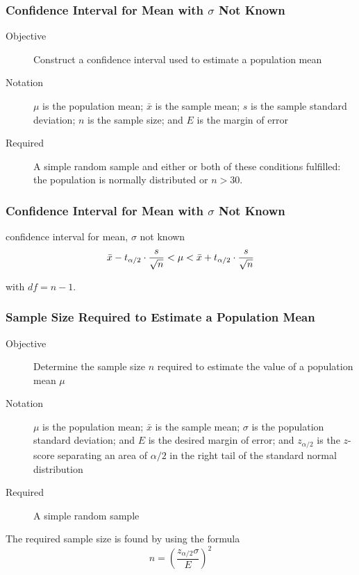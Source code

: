 \documentclass[xcolor=dvipsnames]{beamer}
\begin{document}
\begin{frame}
  \frametitle{Confidence Interval for Mean with $\sigma$
    Not Known}
  \begin{description}
  \item[Objective] Construct a confidence interval used to estimate a
    population mean
  \item[Notation] $\mu$ is the population mean; $\bar{x}$ is the
    sample mean; $s$ is the sample standard deviation; $n$ is the sample size; and $E$ is the margin of
    error
  \item[Required] A simple random sample and either or both of these
    conditions fulfilled: the population is normally distributed or
    $n>30$.
  \end{description}
\end{frame}


\begin{frame}
  \frametitle{Confidence Interval for Mean with $\sigma$
    Not Known}
  \begin{block}{confidence interval for mean, $\sigma$ not known}
    \begin{equation}
      \label{eq:wefahjoh}
      \bar{x}-t_{\alpha/2}\cdot\frac{s}{\sqrt{n}}<\mu<\bar{x}+t_{\alpha/2}\cdot\frac{s}{\sqrt{n}}\notag
    \end{equation}
  \end{block}
with $df=n-1$.
\end{frame}

\begin{frame}
  \frametitle{Sample Size Required to Estimate a Population Mean}
  \begin{description}
  \item[Objective] Determine the sample size $n$ required to estimate
    the value of a population mean $\mu$
  \item[Notation] $\mu$ is the population mean; $\bar{x}$ is the
    sample mean; $\sigma$ is the population standard deviation; and $E$ is the desired margin of
    error; and $z_{\alpha/2}$ is the $z$-score
    separating an area of $\alpha/2$ in the right tail of the standard
    normal distribution
  \item[Required] A simple random sample
  \end{description}
The required sample size is found by using the formula
\begin{equation}
  \label{eq:poyohnuu}
  n=\left(\frac{z_{\alpha/2}\sigma}{E}\right)^{2}
\end{equation}
\end{frame}
\end{document}
